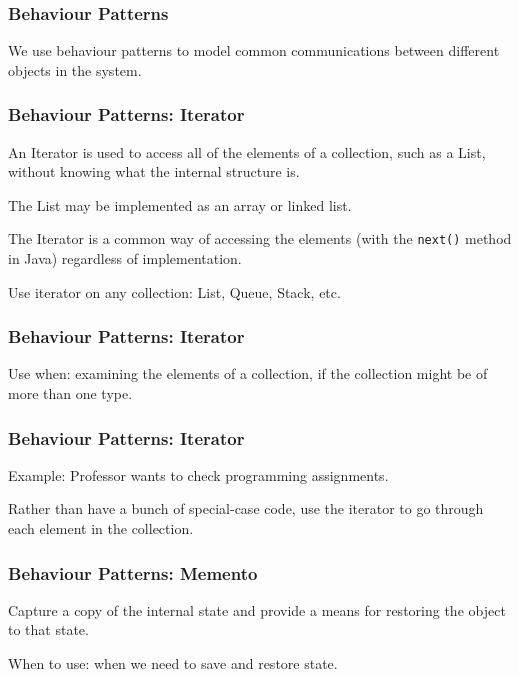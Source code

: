 \begin{frame}
\frametitle{Behaviour Patterns}
\begin{changemargin}{1cm}
We use behaviour patterns to model common communications between different objects in the system.

\end{changemargin}
\end{frame}


\begin{frame}
\frametitle{Behaviour Patterns: Iterator}
\begin{changemargin}{1cm}
An Iterator is used to access all of the elements of a collection, such as a List, without knowing what the internal structure is.

The List may be implemented as an array or linked list. 

The Iterator is a common way of accessing the elements (with the \texttt{next()} method in Java) regardless of implementation.

Use iterator on any collection: List, Queue, Stack, etc.

\end{changemargin}
\end{frame}

\begin{frame}
\frametitle{Behaviour Patterns: Iterator}
\begin{changemargin}{1cm}
Use when: examining the elements of a collection, if the collection might be of more than one type.

\end{changemargin}
\end{frame}

\begin{frame}
\frametitle{Behaviour Patterns: Iterator}
\begin{changemargin}{1cm}
Example: Professor wants to check programming assignments.

Rather than have a bunch of special-case code, use the iterator to go through each element in the collection.

\end{changemargin}
\end{frame}

\begin{frame}
\frametitle{Behaviour Patterns: Memento}
\begin{changemargin}{1cm}
Capture a copy of the internal state and provide a means for restoring the object to that state. 

When to use: when we need to save and restore state. 

\end{changemargin}
\end{frame}

